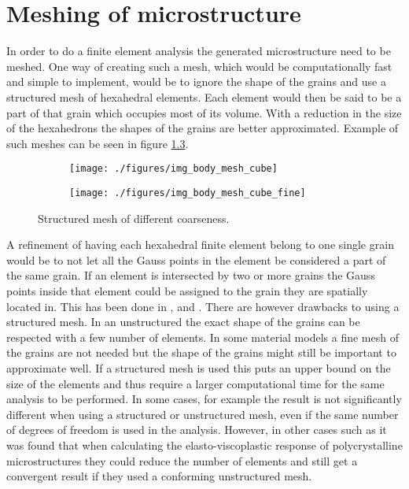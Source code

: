 \documentclass[meshing_micro.tex]{subfiles}
\begin{document}
\chapter{Meshing of microstructure}

In order to do a finite element analysis the generated microstructure need to be meshed. One way of creating such a mesh, which would be computationally fast and simple to implement, would be to ignore the shape of the grains and use a structured mesh of hexahedral elements. Each element would then be said to be a part of that grain which occupies most of its volume. With a reduction in the size of the hexahedrons the shapes of the grains are better approximated. Example of such meshes can be seen in figure \ref{fig:pois_voronoi_mesh_cube}.

\begin{figure}
\centering
\begin{subfigure}[b]{.5\textwidth}
  \centering
  \texttt{[image: ./figures/img\_body\_mesh\_cube]}
  \caption{}
  \label{fig:pois_voronoi_mesh_cube_a}
\end{subfigure}%
\begin{subfigure}[b]{.5\textwidth}
  \centering
  \texttt{[image: ./figures/img\_body\_mesh\_cube\_fine]}
  \caption{}
  \label{fig:pois_voronoi_mesh_cube_b}
\end{subfigure}
\caption{Structured mesh of different coarseness.}
\label{fig:pois_voronoi_mesh_cube}
\end{figure}

A refinement of having each hexahedral finite element belong to one single grain would be to not let all the Gauss points in the element be considered a part of the same grain. 
If an element is intersected by two or more grains the Gauss points inside that element could be assigned to the grain they are spatially located in. 
This has been done in \cite{Nygards20031049}, \cite{Cailletaud2003351} and \cite{Barbe2001513}. There are however drawbacks to using a structured mesh. 
In an unstructured the exact shape of the grains can be respected with a few number of elements. In some material models a fine mesh of the grains are not needed but the shape of the grains might still be important to approximate well. If a structured mesh is used this puts an upper bound on the size of the elements and thus require a larger computational time for the same analysis to be performed.
In some cases, for example \cite{Bohlke201011} the result is not significantly different when using a structured or unstructured mesh, even if the same number of degrees of freedom is used in the analysis. However, in other cases such as \cite{Li20091163} it was found that when calculating the elasto-viscoplastic response of polycrystalline microstructures they could reduce the number of elements and still get a convergent result if they used a conforming unstructured mesh. 
\end{document}
